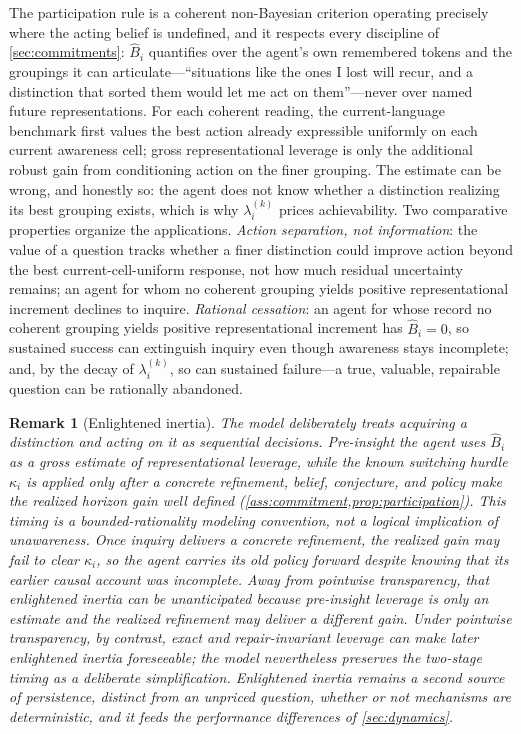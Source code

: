 \documentclass[11pt]{article}
\newtheorem{remark}[assumption]{Remark}
\theoremstyle{definition}
\begin{document}
The participation rule is a coherent non-Bayesian criterion operating precisely where the acting belief is undefined, and it respects every discipline of \cref{sec:commitments}: $\widehat B_i$ quantifies over the agent's own remembered tokens and the groupings it can articulate---``situations like the ones I lost will recur, and a distinction that sorted them would let me act on them''---never over named future representations.
For each coherent reading, the current-language benchmark first values the best action already expressible uniformly on each current awareness cell; gross representational leverage is only the additional robust gain from conditioning action on the finer grouping.
The estimate can be wrong, and honestly so: the agent does not know whether a distinction realizing its best grouping exists, which is why $\lambda_i^{(k)}$ prices achievability.
Two comparative properties organize the applications.
\emph{Action separation, not information}: the value of a question tracks whether a finer distinction could improve action beyond the best current-cell-uniform response, not how much residual uncertainty remains; an agent for whom no coherent grouping yields positive representational increment declines to inquire.
\emph{Rational cessation}: an agent for whose record no coherent grouping yields positive representational increment has $\widehat B_i=0$, so sustained success can extinguish inquiry even though awareness stays incomplete; and, by the decay of $\lambda_i^{(k)}$, so can sustained failure---a true, valuable, repairable question can be rationally abandoned.

\begin{remark}[Enlightened inertia]
\label{rem:stickiness}
The model deliberately treats acquiring a distinction and acting on it as sequential decisions.
Pre-insight the agent uses $\widehat B_i$ as a gross estimate of representational leverage, while the known switching hurdle $\kappa_i$ is applied only after a concrete refinement, belief, conjecture, and policy make the realized horizon gain well defined (\cref{ass:commitment,prop:participation}).
This timing is a bounded-rationality modeling convention, not a logical implication of unawareness.
Once inquiry delivers a concrete refinement, the realized gain may fail to clear $\kappa_i$, so the agent carries its old policy forward despite knowing that its earlier causal account was incomplete.
Away from pointwise transparency, that enlightened inertia can be unanticipated because pre-insight leverage is only an estimate and the realized refinement may deliver a different gain.
Under pointwise transparency, by contrast, exact and repair-invariant leverage can make later enlightened inertia foreseeable; the model nevertheless preserves the two-stage timing as a deliberate simplification.
Enlightened inertia remains a second source of persistence, distinct from an unpriced question, whether or not mechanisms are deterministic, and it feeds the performance differences of \cref{sec:dynamics}.
\end{remark}
\end{document}

